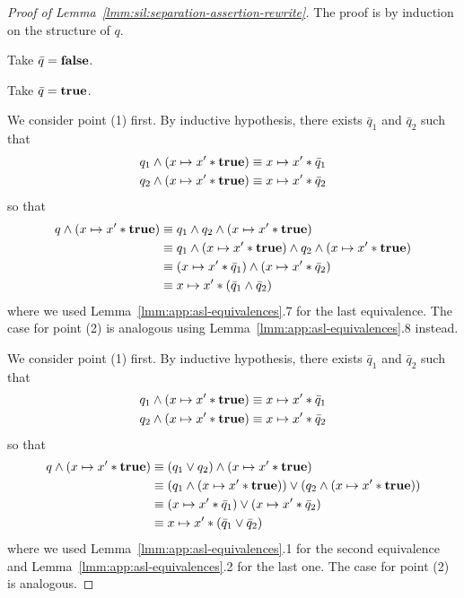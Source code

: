 \begin{proof}[Proof of Lemma~\ref{lmm:sil:separation-assertion-rewrite}]
	The proof is by induction on the structure of $q$.

	Take $\bar{q} = \textbf{false}$.

	Take $\bar{q} = \textbf{true}$.

	We consider point (1) first. By inductive hypothesis, there exists $\bar{q}_1$ and $\bar{q}_2$ such that
	\begin{align*}
		q_1 \land (x \mapsto x' * \textbf{true}) & \equiv x \mapsto x' * \bar{q}_1 \\
		q_2 \land (x \mapsto x' * \textbf{true}) & \equiv x \mapsto x' * \bar{q}_2
	\end{align*}
	so that
	\begin{align*}
		q \land (x \mapsto x' * \textbf{true}) & \equiv q_1 \land q_2 \land (x \mapsto x' * \textbf{true})                                    \\
		                                     & \equiv q_1 \land (x \mapsto x' * \textbf{true}) \land q_2 \land (x \mapsto x' * \textbf{true}) \\
		                                     & \equiv (x \mapsto x' * \bar{q}_1) \land (x \mapsto x' * \bar{q}_2)             \\
		                                     & \equiv x \mapsto x' * (\bar{q}_1 \land \bar{q}_2)
	\end{align*}
	where we used Lemma~\ref{lmm:app:asl-equivalences}.7 for the last equivalence.
	The case for point (2) is analogous using Lemma~\ref{lmm:app:asl-equivalences}.8 instead.

	We consider point (1) first. By inductive hypothesis, there exists $\bar{q}_1$ and $\bar{q}_2$ such that
	\begin{align*}
		q_1 \land (x \mapsto x' * \textbf{true}) & \equiv x \mapsto x' * \bar{q}_1 \\
		q_2 \land (x \mapsto x' * \textbf{true}) & \equiv x \mapsto x' * \bar{q}_2
	\end{align*}
	so that
	\begin{align*}
		q \land (x \mapsto x' * \textbf{true}) & \equiv (q_1 \lor q_2) \land (x \mapsto x' * \textbf{true})                                      \\
		                                     & \equiv (q_1 \land (x \mapsto x' * \textbf{true})) \lor (q_2 \land (x \mapsto x' * \textbf{true})) \\
		                                     & \equiv (x \mapsto x' * \bar{q}_1) \lor (x \mapsto x' * \bar{q}_2)                 \\
		                                     & \equiv x \mapsto x' * (\bar{q}_1 \lor \bar{q}_2)
	\end{align*}
	where we used Lemma~\ref{lmm:app:asl-equivalences}.1 for the second equivalence and Lemma~\ref{lmm:app:asl-equivalences}.2 for the last one.
	The case for point (2) is analogous.


\end{proof}
